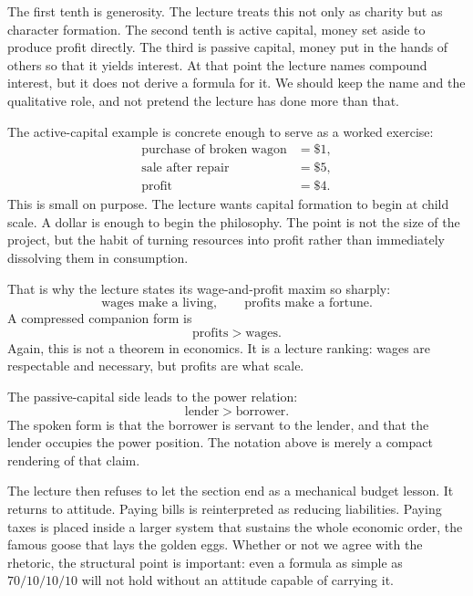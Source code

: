 The first tenth is generosity. The lecture treats this not only as charity but as character formation. The second tenth is active capital, money set aside to produce profit directly. The third is passive capital, money put in the hands of others so that it yields interest. At that point the lecture names compound interest, but it does not derive a formula for it. We should keep the name and the qualitative role, and not pretend the lecture has done more than that.

The active-capital example is concrete enough to serve as a worked exercise:
\begin{align}
\text{purchase of broken wagon} &= \$1,\\
\text{sale after repair} &= \$5,\\
\text{profit} &= \$4.
\end{align}
This is small on purpose. The lecture wants capital formation to begin at child scale. A dollar is enough to begin the philosophy. The point is not the size of the project, but the habit of turning resources into profit rather than immediately dissolving them in consumption.

That is why the lecture states its wage-and-profit maxim so sharply:
\begin{equation}
\text{wages make a living},\qquad \text{profits make a fortune}.
\end{equation}
A compressed companion form is
\begin{equation}
\text{profits} > \text{wages}.
\end{equation}
Again, this is not a theorem in economics. It is a lecture ranking: wages are respectable and necessary, but profits are what scale.

The passive-capital side leads to the power relation:
\begin{equation}
\text{lender} > \text{borrower}.
\end{equation}
The spoken form is that the borrower is servant to the lender, and that the lender occupies the power position. The notation above is merely a compact rendering of that claim.

The lecture then refuses to let the section end as a mechanical budget lesson. It returns to attitude. Paying bills is reinterpreted as reducing liabilities. Paying taxes is placed inside a larger system that sustains the whole economic order, the famous goose that lays the golden eggs. Whether or not we agree with the rhetoric, the structural point is important: even a formula as simple as \(70/10/10/10\) will not hold without an attitude capable of carrying it.

